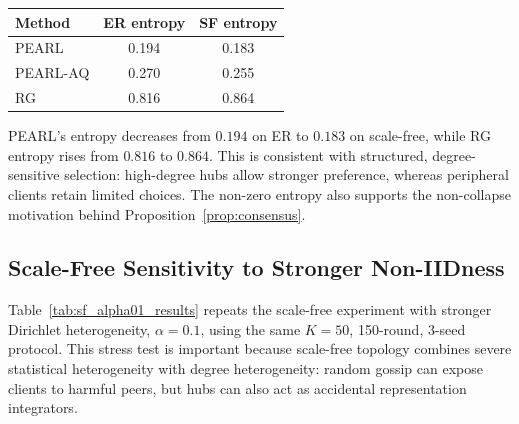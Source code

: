 \documentclass[conference]{IEEEtran}
\begin{document}
\begin{center}
\begin{tabular}{lcc}
\toprule
\textbf{Method} & \textbf{ER entropy} & \textbf{SF entropy} \\
\midrule
\textsc{PEARL}     & 0.194 & 0.183 \\
\textsc{PEARL-AQ} & 0.270 & 0.255 \\
\textsc{RG}    & 0.816 & 0.864 \\
\bottomrule
\end{tabular}
\end{center}
\textsc{PEARL}'s entropy decreases from $0.194$ on ER to $0.183$ on scale-free, while \textsc{RG} entropy rises from $0.816$ to $0.864$. This is consistent with structured, degree-sensitive selection: high-degree hubs allow stronger preference, whereas peripheral clients retain limited choices. The non-zero entropy also supports the non-collapse motivation behind Proposition~\ref{prop:consensus}.

\subsection{Scale-Free Sensitivity to Stronger Non-IIDness}
\label{subsec:sf-alpha01}

Table~\ref{tab:sf_alpha01_results} repeats the scale-free experiment with stronger Dirichlet heterogeneity, $\alpha=0.1$, using the same $K=50$, 150-round, 3-seed protocol. This stress test is important because scale-free topology combines severe statistical heterogeneity with degree heterogeneity: random gossip can expose clients to harmful peers, but hubs can also act as accidental representation integrators.
\end{document}
